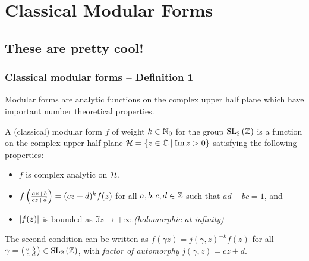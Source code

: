 \section{Classical Modular Forms}


\subsection{These are pretty cool!}

\begin{frame} \frametitle{Classical modular forms -- Definition 1}
  Modular forms are analytic functions on the complex upper half plane which have important number theoretical properties. \pause
  \begin{definition}
    A (classical) modular form $f$ of weight $k \in \NNO$ for the group $\SL[2]{\ZZ}$ is a function on the complex upper half plane $\HH = \setst{z \in \CC}{\Im{z} > 0}$ satisfying the following properties: \pause
    \begin{itemize}
      \item $f$ is complex analytic on $\HH$\pause,
      \item $f\parens{\frac{az+b}{cz+d}} = (cz+d)^{k} f(z)$ for all $a,b,c,d \in \ZZ$ such that $ad-bc = 1$\pause, and
      \item $\abs{f(z)}$ is bounded as $\Im{z} \to +\infty$.\pause \hfill \emph{(holomorphic at infinity)}
    \end{itemize}
  \end{definition}

  The second condition can be written as $f(\gamma z) = j(\gamma,z)^{-k} f(z)$ for all $\gamma = \parens{\begin{smallmatrix} a & b \\ c & d \end{smallmatrix}} \in \SL[2]{\ZZ}$, with \emph{factor of automorphy} $j(\gamma,z) = cz+d$.
\end{frame}


